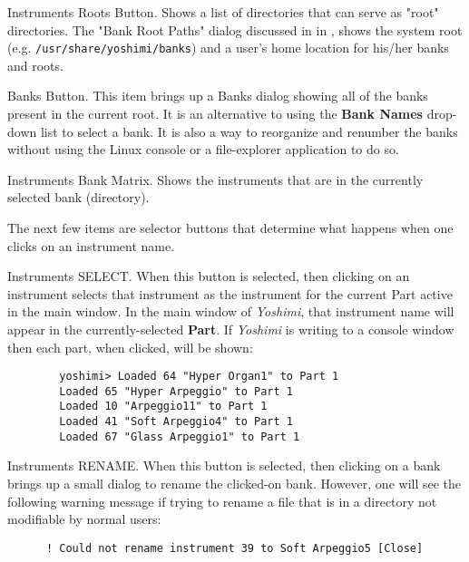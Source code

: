    Instruments Roots Button.
   Shows a list of directories that can serve as "root" directories.
   The "Bank Root Paths" dialog discussed in
    in
   , shows
   the system root (e.g. \texttt{/usr/share/yoshimi/banks}) and
   a user's home location for his/her banks and roots.

   Banks Button.
   This item brings up a Banks dialog showing all of the banks present in the
   current root.
   It is an alternative to using the \textbf{Bank Names} drop-down list to
   select a bank.  It is also a way to reorganize and renumber the
   banks without using the Linux console or a file-explorer application to do
   so.

   Instruments Bank Matrix.
   Shows the instruments that are in the currently selected bank
   (directory).

   The next few items are selector buttons that determine what happens when one
   clicks on an instrument name.

   Instruments SELECT.
   When this button is selected, then clicking on an instrument selects that
   instrument as the instrument for the current Part active in the main
   window.  In the main window of \textsl{Yoshimi}, that instrument name will
   appear in the currently-selected \textbf{Part}.  If \textsl{Yoshimi} is
   writing to a console window then each part, when clicked, will be shown:

   \begin{verbatim}
		yoshimi> Loaded 64 "Hyper Organ1" to Part 1
		Loaded 65 "Hyper Arpeggio" to Part 1
		Loaded 10 "Arpeggio11" to Part 1
		Loaded 41 "Soft Arpeggio4" to Part 1
		Loaded 67 "Glass Arpeggio1" to Part 1
   \end{verbatim}

   Instruments RENAME.
   When this button is selected, then clicking on a bank brings
   up a small dialog to rename the clicked-on bank.
   However, one will see the following warning message if trying to rename a
   file that is in a directory not modifiable by normal users:

   \begin{verbatim}
      ! Could not rename instrument 39 to Soft Arpeggio5 [Close]
   \end{verbatim}

